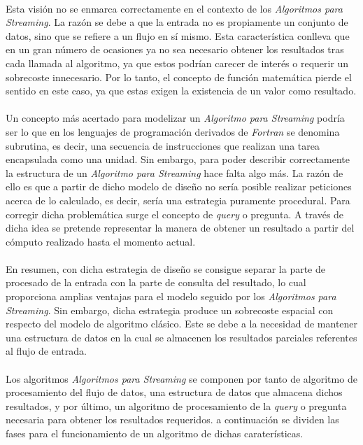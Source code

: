 \documentclass{subfiles}
\begin{document}
      \paragraph{}
      Esta visión no se enmarca correctamente en el contexto de los \emph{Algoritmos para Streaming}. La razón se debe a que la entrada no es propiamente un conjunto de datos, sino que se refiere a un flujo en sí mismo. Esta característica conlleva que en un gran número de ocasiones ya no sea necesario obtener los resultados tras cada llamada al algoritmo, ya que estos podrían carecer de interés o requerir un sobrecoste innecesario. Por lo tanto, el concepto de función matemática pierde el sentido en este caso, ya que estas exigen la existencia de un valor como resultado.

      \paragraph{}
      Un concepto más acertado para modelizar un \emph{Algoritmo para Streaming} podría ser lo que en los lenguajes de programación derivados de \emph{Fortran} se denomina subrutina, es decir, una secuencia de instrucciones que realizan una tarea encapsulada como una unidad. Sin embargo, para poder describir correctamente la estructura de un \emph{Algoritmo para Streaming} hace falta algo más. La razón de ello es que a partir de dicho modelo de diseño no sería posible realizar peticiones acerca de lo calculado, es decir, sería una estrategia puramente procedural. Para corregir dicha problemática surge el concepto de \emph{query} o pregunta. A través de dicha idea se pretende representar la manera de obtener un resultado a partir del cómputo realizado hasta el momento actual.

      \paragraph{}
      En resumen, con dicha estrategia de diseño se consigue separar la parte de procesado de la entrada con la parte de consulta del resultado, lo cual proporciona amplias ventajas para el modelo seguido por los \emph{Algoritmos para Streaming}. Sin embargo, dicha estrategia produce un sobrecoste espacial con respecto del modelo de algoritmo clásico. Este se debe a la necesidad de mantener una estructura de datos en la cual se almacenen los resultados parciales referentes al flujo de entrada.

      \paragraph{}
      Los algoritmos \emph{Algoritmos para Streaming} se componen por tanto de algoritmo de procesamiento del flujo de datos, una estructura de datos que almacena dichos resultados, y por último, un algoritmo de procesamiento de la \emph{query} o pregunta necesaria para obtener los resultados requeridos. a continuación se dividen las fases para el funcionamiento de un algoritmo de dichas caraterísticas.
\end{document}
